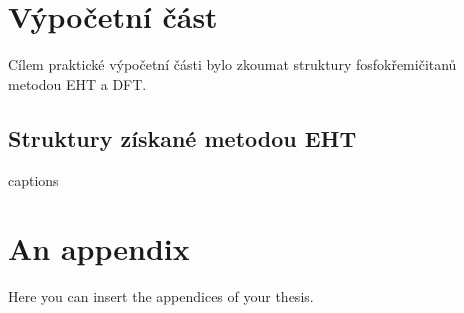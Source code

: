 \documentclass[
  digital, %
  table,   %
  lof,     %
  lot,     %
]{fithesis3}
\begin{document}
\chapter{Výpočetní část}
Cílem praktické výpočetní části bylo zkoumat struktury fosfokřemičitanů metodou EHT a DFT. 
\section{Struktury získané metodou EHT}

{\csname captions\languagename\endcsname %
\makeatletter %
  \thesis@selectLocale{\thesis@locale}\makeatother
\printbibliography[heading=bibintoc]} %
\appendix %
\chapter{An appendix}
Here you can insert the appendices of your thesis.   
\end{document}
